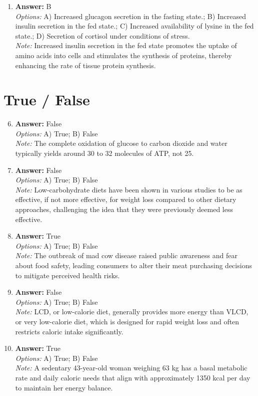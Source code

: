 \documentclass[12pt]{article}
\begin{document}
\begin{enumerate}[label=\arabic*.]
\item \textbf{Answer:} B
\\ \textit{Options:} A) Increased glucagon secretion in the fasting state.; B) Increased insulin secretion in the fed state.; C) Increased availability of lysine in the fed state.; D) Secretion of cortisol under conditions of stress.
\\ \textit{Note:} Increased insulin secretion in the fed state promotes the uptake of amino acids into cells and stimulates the synthesis of proteins, thereby enhancing the rate of tissue protein synthesis.
\end{enumerate}

\section*{True / False}
\begin{enumerate}[label=\arabic*.]
\setcounter{enumi}{5}
\item \textbf{Answer:} False
\\ \textit{Options:} A) True; B) False
\\ \textit{Note:} The complete oxidation of glucose to carbon dioxide and water typically yields around 30 to 32 molecules of ATP, not 25.
\item \textbf{Answer:} False
\\ \textit{Options:} A) True; B) False
\\ \textit{Note:} Low-carbohydrate diets have been shown in various studies to be as effective, if not more effective, for weight loss compared to other dietary approaches, challenging the idea that they were previously deemed less effective.
\item \textbf{Answer:} True
\\ \textit{Options:} A) True; B) False
\\ \textit{Note:} The outbreak of mad cow disease raised public awareness and fear about food safety, leading consumers to alter their meat purchasing decisions to mitigate perceived health risks.
\item \textbf{Answer:} False
\\ \textit{Options:} A) True; B) False
\\ \textit{Note:} LCD, or low-calorie diet, generally provides more energy than VLCD, or very low-calorie diet, which is designed for rapid weight loss and often restricts caloric intake significantly.
\item \textbf{Answer:} True
\\ \textit{Options:} A) True; B) False
\\ \textit{Note:} A sedentary 43-year-old woman weighing 63 kg has a basal metabolic rate and daily caloric needs that align with approximately 1350 kcal per day to maintain her energy balance.
\end{enumerate}
\end{document}
